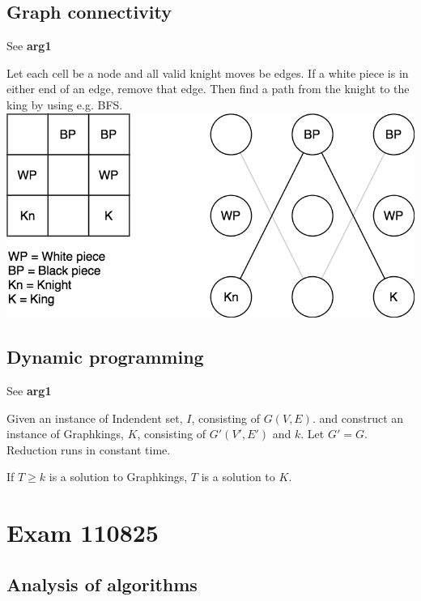 \documentclass[a4paper]{article}
\newenvironment{task}[1]
{
	\begin{description}[align=right]
		\item [#1]
}{		%
	\end{description}
}
\newcommand{\taskref}[1]{\textbf{#1}}
\DeclareMathOperator{\*}{\cdot}
\begin{document}
\subsection*{Graph connectivity}

\begin{task}{7. (a)}
	 See \taskref{arg1}
\end{task}

\begin{task}{(b)}
	Let each cell be a node and all valid knight moves be edges. If a white piece is in either end of an edge, remove that edge. Then find a path from the knight to the king by using e.g. BFS.
	\includegraphics[scale=0.3]{110525-7b.png}
\end{task}

\subsection*{Dynamic programming}

\begin{task}{7. (a)}
	 See \taskref{arg1}
\end{task}



\begin{task}{12. (f)}
	Given an instance of Indendent set, $I$, consisting of $G(V,E)$. and construct an instance of Graphkings, $K$, consisting of $G'(V',E')$ and $k$. Let $G'=G$. Reduction runs in constant time.
	
	If $T\geq k$ is a solution to Graphkings, $T$ is a solution to $K$.
\end{task}

\pagebreak
\section*{Exam 110825}
\subsection*{Analysis of algorithms}
\end{document}
